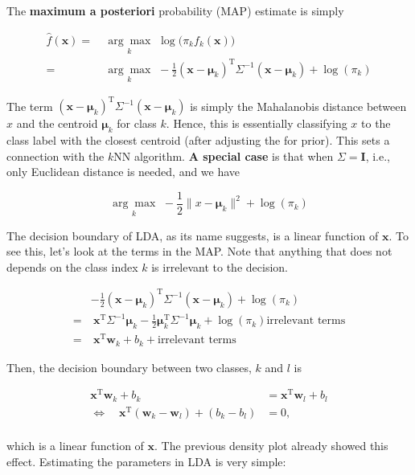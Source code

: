 \documentclass[
]{book}
\theoremstyle{definition}
\theoremstyle{definition}
\theoremstyle{definition}
\theoremstyle{definition}
\theoremstyle{remark}
\begin{document}
The \textbf{maximum a posteriori} probability (MAP) estimate is simply

\begin{align}
\widehat f(\mathbf{x}) =& ~\underset{k}{\arg\max} \,\, \log \big( \pi_k f_k(\mathbf{x}) \big) \\
    =& ~\underset{k}{\arg\max} \,\, - \frac{1}{2} (\mathbf{x}- \boldsymbol \mu_k)^\text{T}\Sigma^{-1} (\mathbf{x}- \boldsymbol \mu_k) + \log(\pi_k)
\end{align}

The term \((\mathbf{x}- \boldsymbol \mu_k)^\text{T}\Sigma^{-1} (\mathbf{x}- \boldsymbol \mu_k)\) is simply the \alert{Mahalanobis distance} between \(x\) and the centroid \(\boldsymbol \mu_k\) for class \(k\). Hence, this is essentially classifying \(x\) to the class label with the closest centroid (after adjusting the for prior). This sets a connection with the \(k\)NN algorithm. \textbf{A special case} is that when \(\Sigma = \mathbf{I}\), i.e., only Euclidean distance is needed, and we have

\[\underset{k}{\arg\max} \,\, - \frac{1}{2} \lVert x - \boldsymbol \mu_k \rVert^2 + \log(\pi_k)\]

The decision boundary of LDA, as its name suggests, is a linear function of \(\mathbf{x}\). To see this, let's look at the terms in the MAP. Note that anything that does not depends on the class index \(k\) is irrelevant to the decision.

\begin{align}
 & - \frac{1}{2} (\mathbf{x}- \boldsymbol \mu_k)^\text{T}\Sigma^{-1} (\mathbf{x}- \boldsymbol \mu_k) + \log(\pi_k)\\
=&~ \mathbf{x}^\text{T}\Sigma^{-1} \boldsymbol \mu_k - \frac{1}{2}\boldsymbol \mu_k^\text{T}\Sigma^{-1} \boldsymbol \mu_k + \log(\pi_k) \text{irrelevant terms} \\
=&~ \mathbf{x}^\text{T}\mathbf{w}_k + b_k + \text{irrelevant terms}
\end{align}

Then, the decision boundary between two classes, \(k\) and \(l\) is

\begin{align}
\mathbf{x}^\text{T}\mathbf{w}_k + b_k &= \mathbf{x}^\text{T}\mathbf{w}_l + b_l \\
\Leftrightarrow \quad \mathbf{x}^\text{T}(\mathbf{w}_k - \mathbf{w}_l) + (b_k - b_l) &= 0, \\
\end{align}

which is a linear function of \(\mathbf{x}\). The previous density plot already showed this effect. Estimating the parameters in LDA is very simple:
\end{document}
